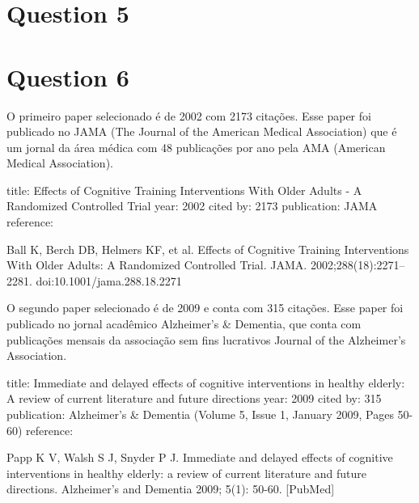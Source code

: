\documentclass[a4paper]{article}    %
\begin{document}
\section*{Question 5}

\section*{Question 6}

O primeiro paper selecionado é de 2002 com 2173 citações. Esse paper foi publicado no JAMA (The Journal of the American Medical Association) que é um jornal da área médica com 48 publicações por ano pela AMA (American Medical Association).

title: Effects of Cognitive Training Interventions With Older Adults - A Randomized Controlled Trial
year: 2002
cited by: 2173
publication: JAMA
reference:

Ball K, Berch DB, Helmers KF, et al. Effects of Cognitive Training Interventions With Older Adults: A Randomized Controlled Trial. JAMA. 2002;288(18):2271–2281. doi:10.1001/jama.288.18.2271


O segundo paper selecionado é de 2009 e conta com 315 citações. Esse paper foi publicado no jornal acadêmico Alzheimer's \& Dementia, que conta com publicações mensais da associação sem fins lucrativos Journal of the Alzheimer's Association.

title: Immediate and delayed effects of cognitive interventions in healthy elderly: A review of current literature and future directions
year: 2009
cited by: 315
publication: Alzheimer's \& Dementia (Volume 5, Issue 1, January 2009, Pages 50-60)
reference:

Papp K V, Walsh S J, Snyder P J. Immediate and delayed effects of cognitive interventions in healthy elderly: a review of current literature and future directions. Alzheimer's and Dementia 2009; 5(1): 50-60. [PubMed]

\end{document}
